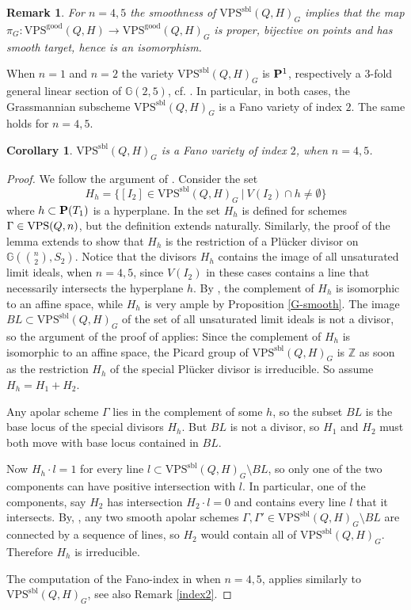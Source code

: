\documentclass{amsart}
\newcommand{\PP}{{\bf P}}
\newcommand{\ZZ}{{\mathbb Z}}
\def\Gr #1#2{{\mathbb G}\left(#1,#2\right)} %
\newcommand{\VPSsbl}{{\mathrm{VPS}}^{\mathrm{sbl}}(Q, H)}
\newcommand{\VPSgood}{{\mathrm{VPS}}^{\mathrm{good}}(Q, H)}
\newtheorem{corollary}[lemma]{\bf Corollary}
\newtheorem{remark}[lemma]{\bf Remark}
\begin{document}
\begin{remark}\label{GoodIsomorphism}
    For $n=4,5$ the smoothness of $\VPSsbl_G$ implies that the map
    $\pi_G\colon \VPSgood\to \VPSgood_G$ is proper, bijective on points and
    has smooth target, hence is an isomorphism.
\end{remark}

When $n=1$ and $n=2$ the variety $\VPSsbl_G$ is $\PP^1$, respectively a $3$-fold
general linear section of $\Gr{2}{5}$, cf. \cite{Mukai}.%
   In particular, in both cases, the Grassmannian subscheme $\VPSsbl_G$ is a Fano variety of index $2$.   The same holds for $n=4,5$.

\begin{corollary}\label{ref:Fano:cor}
   $\VPSsbl_G$ is a Fano variety of index $2$, when $n=4,5$.
\end{corollary}
\begin{proof}
We follow the argument of \cite[Theorem 6.1]{RS}.
Consider the set
$$H_h=\{[I_2]\in \VPSsbl_G\ |\ V(I_2)\cap h\not= \emptyset\}$$
where $h\subset \PP(T_1)$ is a hyperplane.  
In \cite[Lemma 4.9]{RS} the set $H_h$ is defined for schemes $\Gamma\in
{\rm VPS}(Q,n)$, but the definition extends naturally.  Similarly, the proof of the lemma extends to show that $H_h$ is the restriction of a Pl\"ucker divisor on $\Gr{\binom{n}{2}}{S_2}$.
Notice that the divisors $H_h$ contains the image of all unsaturated limit
ideals, when $n=4,5$, since $V(I_2)$ in these cases contains a
line that necessarily intersects the hyperplane $h$.  By \cite[Proposition
5.11]{RS}, the complement of $H_h$ is isomorphic to an affine space, while $H_h$
is very ample by Proposition \ref{G-smooth}. The image $BL\subset \VPSsbl_G$ of
the set of all unsaturated limit ideals is not a divisor, so the argument of
the proof of \cite[Theorem 6.1]{RS} applies: Since the complement of $H_h$ is
isomorphic to an affine space, the Picard group of $\VPSsbl_G$ is $\ZZ$ as soon as the restriction $H_h$ of the special Pl\"ucker divisor is irreducible. So assume $H_h=H_1+H_2$. 

Any apolar scheme $\Gamma$ lies in the complement of some $h$, so the subset $BL$ is the base locus of the special divisors $H_h$.   But $BL$ is not a divisor, so  $H_1$ and $H_2$ must both move with base locus contained in $BL$. 

Now $H_h\cdot l=1$ for every line $l\subset \VPSsbl_G\setminus BL$, so only one of the two components can have positive intersection with $l$. In particular, one of the components, say $H_2$ has intersection $H_2\cdot l=0$ and contains every line $l$ that it intersects. 
By, \cite[Lemma 6.2]{RS}, any two smooth apolar schemes $\Gamma, \Gamma'\in
\VPSsbl_G\setminus BL$ are connected by a sequence of lines, so $H_2$ would
contain all of $\VPSsbl_G$.  Therefore $H_h$ is irreducible.

The computation of the Fano-index in \cite[Theorem 6.1]{RS} when $n=4,5$,
applies similarly to $\VPSsbl_G$, see also Remark \ref{index2}.
\end{proof}
\end{document}
